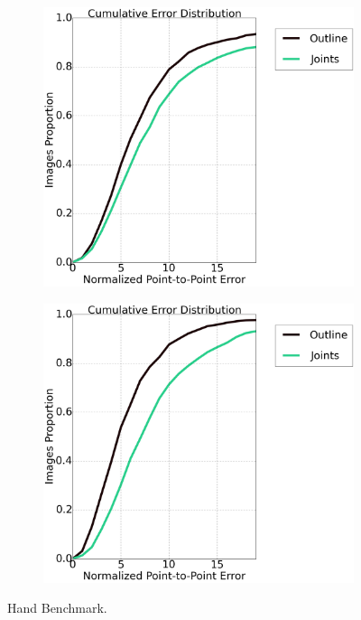 \begin{figure}[t!]
    \centering
    \begin{subfigure}[b]{0.23\textwidth}
            \includegraphics[width=\textwidth]{resources/HandBenchmark/elbow_joints}
    \end{subfigure}
    \hfill
    \begin{subfigure}[b]{0.23\textwidth}
            \includegraphics[width=\textwidth]{resources/HandBenchmark/wrist_joints}
    \end{subfigure}
    \caption{Hand Benchmark.}
    \label{fig:internal_benchmark}
\end{figure}

